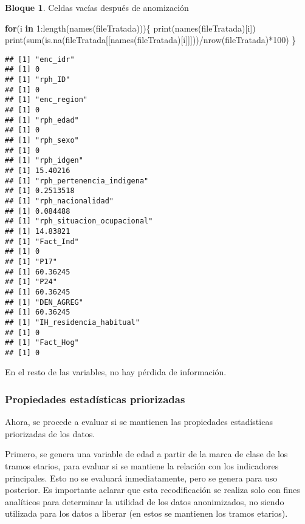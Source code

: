 \documentclass[
]{book}
\newenvironment{Shaded}{\begin{snugshade}}{\end{snugshade}}
\newcommand{\ControlFlowTok}[1]{\textcolor[rgb]{0.13,0.29,0.53}{\textbf{#1}}}
\newcommand{\DecValTok}[1]{\textcolor[rgb]{0.00,0.00,0.81}{#1}}
\newcommand{\FunctionTok}[1]{\textcolor[rgb]{0.00,0.00,0.00}{#1}}
\newcommand{\NormalTok}[1]{#1}
\newcommand{\SpecialCharTok}[1]{\textcolor[rgb]{0.00,0.00,0.00}{#1}}
\theoremstyle{definition}
\theoremstyle{definition}
\newtheorem{example}{Bloque}[chapter]
\theoremstyle{definition}
\theoremstyle{definition}
\theoremstyle{remark}
\begin{document}
\begin{example}
\protect\hypertarget{exm:bloque72nbm}{}\label{exm:bloque72nbm}Celdas vacías después de anomización
\end{example}

\begin{Shaded}
\begin{Highlighting}[]
\ControlFlowTok{for}\NormalTok{(i }\ControlFlowTok{in} \DecValTok{1}\SpecialCharTok{:}\FunctionTok{length}\NormalTok{(}\FunctionTok{names}\NormalTok{(fileTratada)))\{}
  \FunctionTok{print}\NormalTok{(}\FunctionTok{names}\NormalTok{(fileTratada)[i])}
  \FunctionTok{print}\NormalTok{(}\FunctionTok{sum}\NormalTok{(}\FunctionTok{is.na}\NormalTok{(fileTratada[[}\FunctionTok{names}\NormalTok{(fileTratada)[i]]]))}\SpecialCharTok{/}\FunctionTok{nrow}\NormalTok{(fileTratada)}\SpecialCharTok{*}\DecValTok{100}\NormalTok{)}
\NormalTok{\}}
\end{Highlighting}
\end{Shaded}

\begin{verbatim}
## [1] "enc_idr"
## [1] 0
## [1] "rph_ID"
## [1] 0
## [1] "enc_region"
## [1] 0
## [1] "rph_edad"
## [1] 0
## [1] "rph_sexo"
## [1] 0
## [1] "rph_idgen"
## [1] 15.40216
## [1] "rph_pertenencia_indigena"
## [1] 0.2513518
## [1] "rph_nacionalidad"
## [1] 0.084488
## [1] "rph_situacion_ocupacional"
## [1] 14.83821
## [1] "Fact_Ind"
## [1] 0
## [1] "P17"
## [1] 60.36245
## [1] "P24"
## [1] 60.36245
## [1] "DEN_AGREG"
## [1] 60.36245
## [1] "IH_residencia_habitual"
## [1] 0
## [1] "Fact_Hog"
## [1] 0
\end{verbatim}

En el resto de las variables, no hay pérdida de información.

\hypertarget{propiedades-estaduxedsticas-priorizadas}{%
\subsubsection{Propiedades estadísticas priorizadas}\label{propiedades-estaduxedsticas-priorizadas}}

Ahora, se procede a evaluar si se mantienen las propiedades estadísticas priorizadas de los datos.

Primero, se genera una variable de edad a partir de la marca de clase de los tramos etarios, para evaluar si se mantiene la relación con los indicadores principales. Esto no se evaluará inmediatamente, pero se genera para uso posterior. Es importante aclarar que esta recodificación se realiza solo con fines analíticos para determinar la utilidad de los datos anonimizados, no siendo utilizada para los datos a liberar (en estos se mantienen los tramos etarios).
\end{document}
